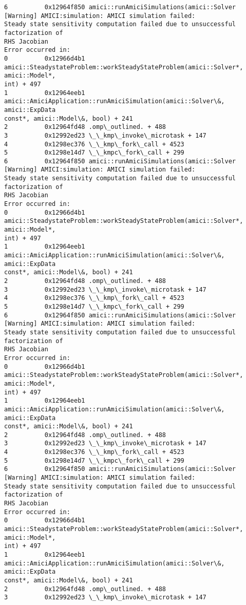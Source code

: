 \documentclass[11pt]{article}
\begin{document}
\begin{Verbatim}[commandchars=\\\{\}]
6          0x12964f850 amici::runAmiciSimulations(amici::Solver
[Warning] AMICI:simulation: AMICI simulation failed:
Steady state sensitivity computation failed due to unsuccessful factorization of
RHS Jacobian
Error occurred in:
0          0x12966d4b1
amici::SteadystateProblem::workSteadyStateProblem(amici::Solver*, amici::Model*,
int) + 497
1          0x12964eeb1
amici::AmiciApplication::runAmiciSimulation(amici::Solver\&, amici::ExpData
const*, amici::Model\&, bool) + 241
2          0x12964fd48 .omp\_outlined. + 488
3          0x12992ed23 \_\_kmp\_invoke\_microtask + 147
4          0x1298ec376 \_\_kmp\_fork\_call + 4523
5          0x1298e14d7 \_\_kmpc\_fork\_call + 299
6          0x12964f850 amici::runAmiciSimulations(amici::Solver
[Warning] AMICI:simulation: AMICI simulation failed:
Steady state sensitivity computation failed due to unsuccessful factorization of
RHS Jacobian
Error occurred in:
0          0x12966d4b1
amici::SteadystateProblem::workSteadyStateProblem(amici::Solver*, amici::Model*,
int) + 497
1          0x12964eeb1
amici::AmiciApplication::runAmiciSimulation(amici::Solver\&, amici::ExpData
const*, amici::Model\&, bool) + 241
2          0x12964fd48 .omp\_outlined. + 488
3          0x12992ed23 \_\_kmp\_invoke\_microtask + 147
4          0x1298ec376 \_\_kmp\_fork\_call + 4523
5          0x1298e14d7 \_\_kmpc\_fork\_call + 299
6          0x12964f850 amici::runAmiciSimulations(amici::Solver
[Warning] AMICI:simulation: AMICI simulation failed:
Steady state sensitivity computation failed due to unsuccessful factorization of
RHS Jacobian
Error occurred in:
0          0x12966d4b1
amici::SteadystateProblem::workSteadyStateProblem(amici::Solver*, amici::Model*,
int) + 497
1          0x12964eeb1
amici::AmiciApplication::runAmiciSimulation(amici::Solver\&, amici::ExpData
const*, amici::Model\&, bool) + 241
2          0x12964fd48 .omp\_outlined. + 488
3          0x12992ed23 \_\_kmp\_invoke\_microtask + 147
4          0x1298ec376 \_\_kmp\_fork\_call + 4523
5          0x1298e14d7 \_\_kmpc\_fork\_call + 299
6          0x12964f850 amici::runAmiciSimulations(amici::Solver
[Warning] AMICI:simulation: AMICI simulation failed:
Steady state sensitivity computation failed due to unsuccessful factorization of
RHS Jacobian
Error occurred in:
0          0x12966d4b1
amici::SteadystateProblem::workSteadyStateProblem(amici::Solver*, amici::Model*,
int) + 497
1          0x12964eeb1
amici::AmiciApplication::runAmiciSimulation(amici::Solver\&, amici::ExpData
const*, amici::Model\&, bool) + 241
2          0x12964fd48 .omp\_outlined. + 488
3          0x12992ed23 \_\_kmp\_invoke\_microtask + 147

\end{Verbatim}
\end{document}

